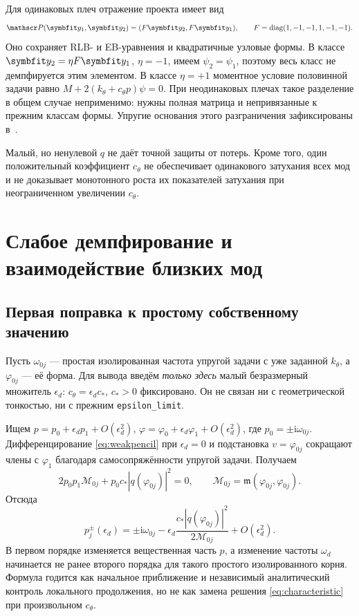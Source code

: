 \documentclass[11pt,a4paper]{article}
\numberwithin{equation}{section}
\newcommand{\ii}{\mathrm i}
\newcommand{\kth}{k_\theta}
\newcommand{\cth}{c_\theta}
\newcommand{\abs}[1]{\left|#1\right|}
\DeclareMathOperator{\diag}{diag}
\begin{document}
Для одинаковых плеч отражение проекта имеет вид
\[
 \mathscr P(\symbfit y_1,\symbfit y_2)
 =(F\symbfit y_2,F\symbfit y_1),\qquad
 F=\diag(1,-1,-1,1,-1,-1).
\]
Оно сохраняет RLB- и EB-уравнения и квадратичные узловые формы.
В классе $\symbfit y_2=\eta F\symbfit y_1$, $\eta=-1$,
имеем $\psi_2=\psi_1$, поэтому весь класс не демпфируется этим элементом.
В классе $\eta=+1$ моментное условие половинной задачи равно
$M+2(\kth+\cth p)\psi=0$. При неодинаковых плечах такое разделение
в общем случае неприменимо: нужны полная матрица и непривязанные
к прежним классам формы. Упругие основания этого разграничения
зафиксированы в~\cite{projectrobustness}.

Малый, но ненулевой $q$ не даёт точной защиты от потерь. Кроме того,
один положительный коэффициент $\cth$ не обеспечивает одинакового
затухания всех мод и не доказывает монотонного роста их показателей
затухания при неограниченном увеличении $\cth$.

\section{Слабое демпфирование и взаимодействие близких мод}
\label{sec:small}

\subsection{Первая поправка к простому собственному значению}

Пусть $\omega_{0j}$ --- простая изолированная частота упругой задачи
с уже заданной $\kth$, а $\varphi_{0j}$ --- её форма.
Для вывода введём \emph{только здесь} малый безразмерный множитель
$\epsilon_d$: $\cth=\epsilon_d c_*$, $c_*>0$ фиксировано.
Он не связан ни с геометрической тонкостью, ни с прежним
\texttt{epsilon\_limit}.

Ищем $p=p_0+\epsilon_dp_1+O(\epsilon_d^2)$,
$\varphi=\varphi_0+\epsilon_d\varphi_1+O(\epsilon_d^2)$,
где $p_0=\pm\ii\omega_{0j}$. Дифференцирование
\eqref{eq:weakpencil} при $\epsilon_d=0$ и подстановка
$v=\varphi_{0j}$ сокращают члены с $\varphi_1$ благодаря
самосопряжённости упругой задачи. Получаем
\[
 2p_0p_1\mathcal M_{0j}+p_0c_*\abs{q(\varphi_{0j})}^2=0,
 \qquad \mathcal M_{0j}=\mathfrak m(\varphi_{0j},\varphi_{0j}).
\]
Отсюда
\begin{equation}
 \boxed{
 p_j^\pm(\epsilon_d)=\pm\ii\omega_{0j}
 -\epsilon_d\frac{c_*\abs{q(\varphi_{0j})}^2}{2\mathcal M_{0j}}
 +O(\epsilon_d^2).}
 \label{eq:smallp}
\end{equation}
В первом порядке изменяется вещественная часть $p$, а изменение
частоты $\omega_d$ начинается не ранее второго порядка для такого
простого изолированного корня. Формула годится как начальное приближение
и независимый аналитический контроль локального продолжения, но не как
замена решения \eqref{eq:characteristic} при произвольном $\cth$.
\end{document}
